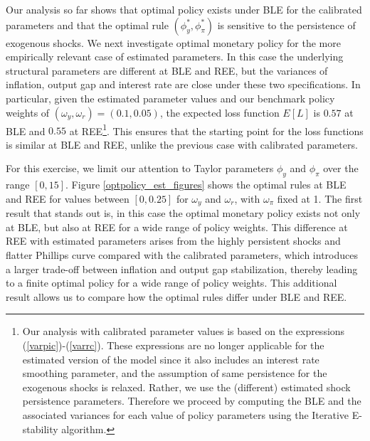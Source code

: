 \vspace{3 mm}


Our analysis so far shows that optimal policy exists under BLE for the calibrated parameters and that the optimal rule $(\phi_{y}^{*},\phi_{\pi}^{*})$ is sensitive to the persistence of exogenous shocks. We next investigate optimal monetary policy for the more empirically relevant case of estimated parameters. In this case the underlying structural parameters are different at BLE and REE, but the variances of inflation, output gap and interest rate are close under these two specifications. In particular, given the estimated parameter values and our benchmark policy weights of $(\omega_y, \omega_r)=(0.1,0.05)$, the expected loss function $E[L]$ is $0.57$ at BLE and $0.55$ at REE\footnote{Our analysis with calibrated parameter values is based on the expressions (\ref{varpic})-(\ref{varrc}). These expressions are no longer applicable for the estimated version of the model since it also includes an interest rate smoothing parameter, and the assumption of same persistence for the exogenous shocks is relaxed. Rather, we use the (different) estimated shock persistence parameters. Therefore we proceed by computing the BLE and the associated variances for each value of policy parameters using the Iterative E-stability algorithm.}. This ensures that the starting point for the loss functions is similar at BLE and REE, unlike the previous case with calibrated parameters.

For this exercise, we limit our attention to Taylor parameters $\phi_y$ and $\phi_{\pi}$ over the range $[0,15]$. Figure \ref{optpolicy_est_figures} shows the optimal rules at BLE and REE for values between $[0, 0.25]$ for $\omega_y$ and $\omega_r$, with $\omega_{\pi}$ fixed at 1. The first result that stands out is, in this case the optimal monetary policy exists not only at BLE, but also at REE for a wide range of policy weights. This difference at REE with estimated parameters arises from the highly persistent shocks and flatter Phillips curve compared with the calibrated parameters, which introduces a larger trade-off between inflation and output gap stabilization, thereby leading to a finite optimal policy for a wide range of policy weights. This additional result allows us to compare how the optimal rules differ under BLE and REE.

